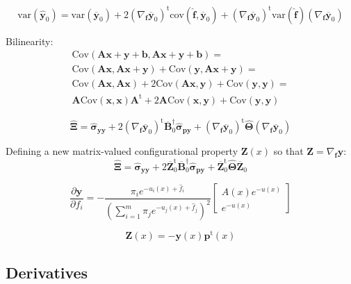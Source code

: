 \documentclass[aip,jcp,reprint,amsmath,amssymb]{revtex4-1}
\newcommand{\mt}[1]{\boldsymbol{\mathbf{#1}}}           %
\newcommand{\vt}[1]{\boldsymbol{\mathbf{#1}}}           %
\newcommand{\tr}[1]{#1^\text{t}}                        %
\begin{document}
\begin{equation}
\text{var}(\hat{\vt y}_0) = \text{var}(\overline{\vt y}_0) + 2\tr{(\nabla_{\vt f}\overline{\vt y}_0)}\text{cov}(\hat{\vt f},\overline{\vt y}_0) + \tr{(\nabla_{\vt f}\overline{\vt y}_0)}\text{var}(\hat{\vt f})(\nabla_{\vt f}\overline{\vt y}_0)
\end{equation}

Bilinearity:
\begin{gather*}
\text{Cov}(\mt A \mt x + \mt y + \vt b,\mt A \mt x + \mt y + \vt b) = \\ \text{Cov}(\mt A \mt x,\mt A \mt x + \mt y) + \text{Cov}(\mt y,\mt A \mt x + \mt y) = \\ \text{Cov}(\mt A \mt x,\mt A \mt x) + 2 \text{Cov}(\mt A \mt x,\mt y) + \text{Cov}(\mt y,\mt y) = \\ \mt A \text{Cov}(\mt x,\mt x) \tr{\mt A} + 2 \mt A \text{Cov}(\mt x,\mt y) + \text{Cov}(\mt y,\mt y)
\end{gather*}

\begin{equation}
\hat{\mt \Xi} = \hat{\mt \sigma}_{\vt y\vt y} + 2\tr{(\nabla_{\vt f}\overline{\vt y}_0)} \overline{\mt B}_0^\dag \hat{\mt \sigma}_{\vt p\vt y} + \tr{(\nabla_{\vt f}\overline{\vt y}_0)}\hat{\mt \Theta}{(\nabla_{\vt f}\overline{\vt y}_0)}
\end{equation}

Defining a new matrix-valued configurational property $\mt Z(x)$ so that $\mt Z = \nabla_{\vt f}\vt y$:
\begin{equation}
\hat{\mt \Xi} = \hat{\mt \sigma}_{\vt y\vt y} + 2\tr{\overline{\mt Z}_0} \overline{\mt B}_0^\dag \hat{\mt \sigma}_{\vt p\vt y} + \tr{\overline{\mt Z}_0}\hat{\mt \Theta}{\overline{\mt Z}_0}
\end{equation}

\begin{equation}
\frac{\partial \vt y}{\partial f_i} = -\frac{\pi_i e^{-u_i(x) + \hat f_i}}{\left(\sum_{i=1}^m \pi_j e^{-u_j(x) + \hat f_j}\right)^2} \left[\begin{array}{c} A(x)e^{-u(x)} \\ e^{-u(x)} \end{array}\right]
\end{equation}

\begin{equation}
\mt Z(x) = -{\vt y(x)}\tr{\vt p}(x)
\end{equation}

\subsection{Derivatives}
\end{document}
